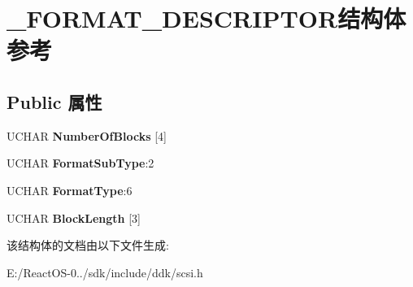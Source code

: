 \hypertarget{struct___f_o_r_m_a_t___d_e_s_c_r_i_p_t_o_r}{}\section{\+\_\+\+F\+O\+R\+M\+A\+T\+\_\+\+D\+E\+S\+C\+R\+I\+P\+T\+O\+R结构体 参考}
\label{struct___f_o_r_m_a_t___d_e_s_c_r_i_p_t_o_r}
\subsection*{Public 属性}
\begin{DoxyCompactItemize}
\item 
\mbox{\label{struct___f_o_r_m_a_t___d_e_s_c_r_i_p_t_o_r_a6dfb1b21887a65a167aa13a9ca6dca82}} 
U\+C\+H\+AR {\bfseries Number\+Of\+Blocks} \mbox{[}4\mbox{]}
\item 
\mbox{\label{struct___f_o_r_m_a_t___d_e_s_c_r_i_p_t_o_r_a9eaca628d19dbf4f851e529d6be4026c}} 
U\+C\+H\+AR {\bfseries Format\+Sub\+Type}\+:2
\item 
\mbox{\label{struct___f_o_r_m_a_t___d_e_s_c_r_i_p_t_o_r_af776475276c79d0eefb1a49d493d60cc}} 
U\+C\+H\+AR {\bfseries Format\+Type}\+:6
\item 
\mbox{\label{struct___f_o_r_m_a_t___d_e_s_c_r_i_p_t_o_r_a4596be1d5256946b93fa14f41244ad41}} 
U\+C\+H\+AR {\bfseries Block\+Length} \mbox{[}3\mbox{]}
\end{DoxyCompactItemize}


该结构体的文档由以下文件生成\+:\begin{DoxyCompactItemize}
\item 
E\+:/\+React\+O\+S-\/0../sdk/include/ddk/scsi.\+h\end{DoxyCompactItemize}
